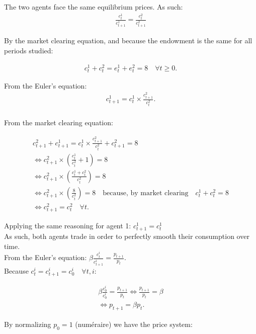\documentclass{article}
\begin{document}
The two agents face the same equilibrium prices. As such:
\begin{gather*}
    \frac{c^{1}_{t}}{c^{1}_{t+1}}=\frac{c^{2}_{t}}{c^{2}_{t+1}}
\end{gather*}

By the market clearing equation, and because the endowment is the same for all periods studied:

\begin{gather*}
    c_t^1+c_t^2=e_t^1+e_t^2=8 \quad \forall t \geq 0.
\end{gather*}

From the Euler's equation:
\begin{gather*}
    c_{t+1}^1=c_t^1 \times \frac{c_{t+1}^2}{c_{t}^2}. \\
\end{gather*}

From the market clearing equation:

\begin{gather*}
    c_{t+1}^2+c_{t+1}^1=c_t^1 \times \frac{c_{t+1}^2}{c_{t}^2}+ c_{t+1}^2=8 \\
    \Leftrightarrow c_{t+1}^2\times \left(\frac{c_t^1}{c_t^2}+1\right)=8 \\
    \Leftrightarrow c_{t+1}^2\times \left(\frac{c_t^1+c_t^2}{c_t^2}\right)=8\\
    \Leftrightarrow c_{t+1}^2\times \left(\frac{8}{c_t^2}\right)=8 \quad\mbox{because, by market clearing}\quad c_t^1+c_t^2=8\\
    \Leftrightarrow c_{t+1}^2=c_{t}^2 \quad\forall t.
\end{gather*}

Applying the same reasoning for agent 1: $c_{t+1}^1=c_{t}^1$\\

As such, both agents trade in order to perfectly smooth their consumption over time.\\

From the Euler's equation: $\beta \frac{c^{i}_{t}}{c^{i}_{t+1}}=\frac{p_{t+1}}{p_{t}}$.\\
Because $c_t^{i}=c_{t+1}^{i}=c_0^{i}\quad\forall t, i$:

\begin{gather*}
    \beta \frac{c^{i}_{0}}{c^{i}_{0}}=\frac{p_{t+1}}{p_{t}}
    \Leftrightarrow \frac{p_{t+1}}{p_{t}}=\beta\\
    \Leftrightarrow p_{t+1}=\beta p_{t}.
\end{gather*}

By normalizing $p_{0}=1$ (numéraire) we have the price system:
\end{document}
